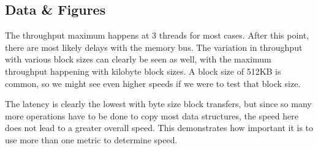 \documentclass{article}
\begin{document}
\subsection{Data \& Figures}
\begin{figure}[H]
\end{figure}

The throughput maximum happens at 3 threads for most cases.  After this point, there are most likely delays with the memory bus.  The variation in throughput with various block sizes can clearly be seen as well, with the maximum throughput happening with kilobyte block sizes.  A block size of 512KB is common, so we might see even higher speeds if we were to test that block size. \\

\begin{figure}[H]
\end{figure}

The latency is clearly the lowest with byte size block transfers, but since so many more operations have to be done to copy most data structures, the speed here does not lead to a greater overall speed.  This demonstrates how important it is to use more than one metric to determine speed.
\end{document}
